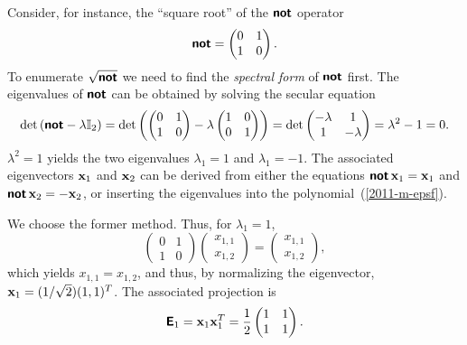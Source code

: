 {Consider, for instance, the ``square root''  of the $\textsf{\textbf{not}}$ operator
\begin{equation}
\textsf{\textbf{not}}
=
\begin{pmatrix}
 0&1\\  1&0
\end{pmatrix}.
\end{equation}
To enumerate $\sqrt{\textsf{\textbf{not}}}$  we need to find the {\em spectral form} of $\textsf{\textbf{not}}$ first.
The eigenvalues of  $\textsf{\textbf{not}}$ can be obtained by solving the
secular equation
\begin{equation}
\text{det}
\left(
\textsf{\textbf{not}} - \lambda {\Bbb I}_2
\right)
=
\text{det}
\left(
\begin{pmatrix}
 0&1\\  1&0
\end{pmatrix}
-
\lambda
\begin{pmatrix}
1&0\\  0&1
\end{pmatrix}
\right)
=
\text{det}
\begin{pmatrix}
 -\lambda&1\\
1&-\lambda
\end{pmatrix}
   =\lambda^2-1=0.
\end{equation}
$\lambda^2=1$ yields the two eigenvalues
$\lambda_1=1$
and
$\lambda_1=-1$.
The associated eigenvectors
${\bf x}_1$
and
${\bf x}_2$
can be derived from either the equations
$\textsf{\textbf{not}}\,{\bf x}_1={\bf x}_1$
and
$\textsf{\textbf{not}}\,{\bf x}_2=-{\bf x}_2$,
or inserting the eigenvalues into the polynomial~(\ref{2011-m-epsf}).

We choose the former method.
Thus, for $\lambda_1=1$,
\begin{equation}
\begin{pmatrix}
 0&1\\  1&0
\end{pmatrix}
\begin{pmatrix}
x_{1,1}\\x_{1,2}
\end{pmatrix}
=\begin{pmatrix}
x_{1,1}\\x_{1,2}
\end{pmatrix}
,
\end{equation}
which yields  $x_{1,1}=x_{1,2}$, and thus, by normalizing the eigenvector,
${\bf x}_1=(1/\sqrt{2})(1,1)^T$.
The associated projection is
\begin{equation}
\textsf{\textbf{E}}_1={\bf x}_1{\bf x}_1^T=\frac{1}{2}
\begin{pmatrix}
 1&1\\  1&1
\end{pmatrix}
.
\end{equation}


}
